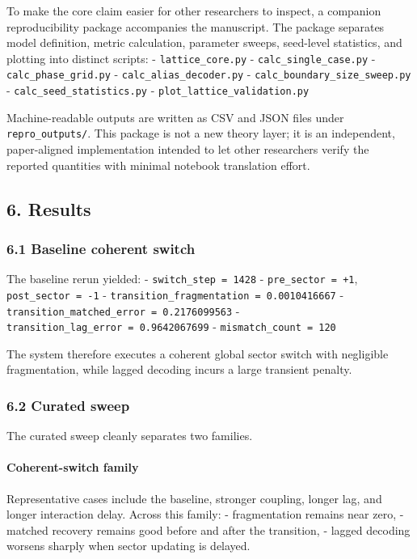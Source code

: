 \documentclass[
]{article}
\begin{document}
To make the core claim easier for other researchers to inspect, a
companion reproducibility package accompanies the manuscript. The
package separates model definition, metric calculation, parameter
sweeps, seed-level statistics, and plotting into distinct scripts: -
\texttt{lattice\_core.py} - \texttt{calc\_single\_case.py} -
\texttt{calc\_phase\_grid.py} - \texttt{calc\_alias\_decoder.py} -
\texttt{calc\_boundary\_size\_sweep.py} -
\texttt{calc\_seed\_statistics.py} -
\texttt{plot\_lattice\_validation.py}

Machine-readable outputs are written as CSV and JSON files under
\texttt{repro\_outputs/}. This package is not a new theory layer; it is
an independent, paper-aligned implementation intended to let other
researchers verify the reported quantities with minimal notebook
translation effort.

\subsection{6. Results}\label{results}

\subsubsection{6.1 Baseline coherent
switch}\label{baseline-coherent-switch}

The baseline rerun yielded: - \texttt{switch\_step\ =\ 1428} -
\texttt{pre\_sector\ =\ +1}, \texttt{post\_sector\ =\ -1} -
\texttt{transition\_fragmentation\ =\ 0.0010416667} -
\texttt{transition\_matched\_error\ =\ 0.2176099563} -
\texttt{transition\_lag\_error\ =\ 0.9642067699} -
\texttt{mismatch\_count\ =\ 120}

The system therefore executes a coherent global sector switch with
negligible fragmentation, while lagged decoding incurs a large transient
penalty.

\subsubsection{6.2 Curated sweep}\label{curated-sweep}

The curated sweep cleanly separates two families.

\paragraph{Coherent-switch family}\label{coherent-switch-family}

Representative cases include the baseline, stronger coupling, longer
lag, and longer interaction delay. Across this family: - fragmentation
remains near zero, - matched recovery remains good before and after the
transition, - lagged decoding worsens sharply when sector updating is
delayed.
\end{document}
